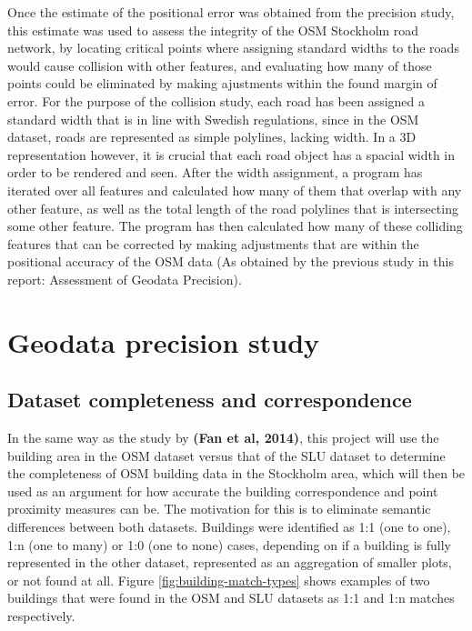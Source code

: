 \documentclass{kththesis}
\begin{document}
Once the estimate of the positional error was obtained from the precision study, this estimate was used to assess the integrity of the OSM Stockholm road network, by locating critical points where assigning standard widths to the roads would cause collision with other features, and evaluating how many of those points could be eliminated by making ajustments within the found margin of error.
For the purpose of the collision study, each road has been assigned a standard width that is in line with Swedish regulations, since in the OSM dataset, roads are represented as simple polylines, lacking width.
In a 3D representation however, it is crucial that each road object has a spacial width in order to be rendered and seen.
After the width assignment, a program has iterated over all features and calculated how many of them that overlap with any other feature, as well as the total length of the road polylines that is intersecting some other feature.
The program has then calculated how many of these colliding features that can be corrected by making adjustments that are within the positional accuracy of the OSM data (As obtained by the previous study in this report: Assessment of Geodata Precision).

\section{Geodata precision study}

\subsection{Dataset completeness and correspondence}

In the same way as the study by \textbf{(Fan et al, 2014)}, this project will use the building area in the OSM dataset versus that of the SLU dataset to determine the completeness of OSM building data in the Stockholm area, which will then be used as an argument for how accurate the building correspondence and point proximity measures can be.
The motivation for this is to eliminate semantic differences between both datasets.
Buildings were identified as 1:1 (one to one), 1:n (one to many) or 1:0 (one to none) cases, depending on if a building is fully represented in the other dataset, represented as an aggregation of smaller plots, or not found at all.
Figure \ref{fig:building-match-types} shows examples of two buildings that were found in the OSM and SLU datasets as 1:1 and 1:n matches respectively.
\end{document}
